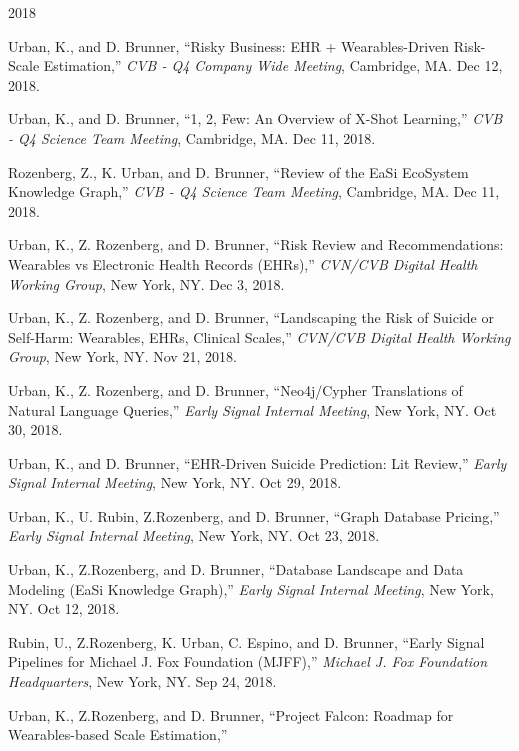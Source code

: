 \begin{center} \Large{2018} \end{center}
\normalsize
\begin{itemize*}
  \item
    Urban, K., and D. Brunner, 
    ``Risky Business: EHR + Wearables-Driven Risk-Scale Estimation,''
    {\em CVB - Q4 Company Wide Meeting},
    Cambridge, MA. Dec 12, 2018.
  \item
    Urban, K., and D. Brunner, 
    ``1, 2, Few: An Overview of X-Shot Learning,''
    {\em CVB - Q4 Science Team Meeting},
    Cambridge, MA. Dec 11, 2018.
  \item
    Rozenberg, Z., K. Urban, and D. Brunner, 
    ``Review of the EaSi EcoSystem Knowledge Graph,''
    {\em CVB - Q4 Science Team Meeting},
    Cambridge, MA. Dec 11, 2018.
  \item
    Urban, K., Z. Rozenberg, and D. Brunner, 
    ``Risk Review and Recommendations: Wearables vs Electronic Health Records (EHRs),''
    {\em CVN/CVB Digital Health Working Group},
    New York, NY. Dec 3, 2018.
  \item
    Urban, K., Z. Rozenberg, and D. Brunner, 
    ``Landscaping the Risk of Suicide or Self-Harm: Wearables, EHRs, Clinical Scales,''
    {\em CVN/CVB Digital Health Working Group},
    New York, NY. Nov 21, 2018.
  \item
    Urban, K., Z. Rozenberg, and D. Brunner, 
    ``Neo4j/Cypher Translations of Natural Language Queries,''
    {\em Early Signal Internal Meeting},
    New York, NY. Oct 30, 2018.
  \item
    Urban, K., and D. Brunner, 
    ``EHR-Driven Suicide Prediction: Lit Review,''
    {\em Early Signal Internal Meeting},
    New York, NY. Oct 29, 2018.
  \item
    Urban, K., U. Rubin, Z.Rozenberg, and D. Brunner, 
    ``Graph Database Pricing,''
    {\em Early Signal Internal Meeting},
    New York, NY. Oct 23, 2018.
  \item
    Urban, K., Z.Rozenberg, and D. Brunner, 
    ``Database Landscape and Data Modeling (EaSi Knowledge Graph),''
    {\em Early Signal Internal Meeting},
    New York, NY. Oct 12, 2018.
  \item
    Rubin, U., Z.Rozenberg, K. Urban, C. Espino, and D. Brunner, 
    ``Early Signal Pipelines for Michael J. Fox Foundation (MJFF),''
    {\em Michael J. Fox Foundation Headquarters},
    New York, NY. Sep 24, 2018.
  \item
    Urban, K., Z.Rozenberg, and D. Brunner, 
    ``Project Falcon: Roadmap for Wearables-based Scale Estimation,''

\end{itemize*}
